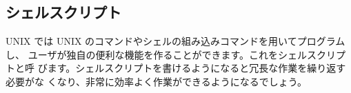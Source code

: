 \documentclass[platex]{jsarticle}
\begin{document}


 \subsection{シェルスクリプト}
 UNIX では UNIX のコマンドやシェルの組み込みコマンドを用いてプログラムし、
 ユーザが独自の便利な機能を作ることができます。これをシェルスクリプトと呼
 びます。シェルスクリプトを書けるようになると冗長な作業を繰り返す必要がな
 くなり、非常に効率よく作業ができるようになるでしょう。



%
\end{document}
